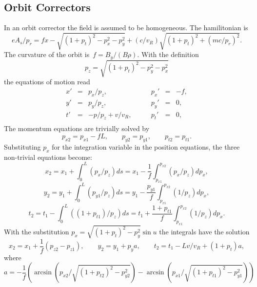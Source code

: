 \documentclass{report}
\begin{document}
\clearpage
\subsection{Orbit Correctors}
In an orbit corrector the field is assumed to be homogeneous.
The hamilitonian is
\begin{equation}
  eA_s/p_r = fx - \sqrt{(1+p_t)^2-p_x^2-p_y^2} +
  (c/v_R) \sqrt{(1+p_t)^2+(mc/p_r)^2}.
\end{equation}
The curvature of the orbit is~$f = B_y / (B \rho)$.
With the definition 
\begin{equation}
  p_z = \sqrt{(1+p_t)^2-p_y^2-p_x^2}
\end{equation}
the equations of motion read
\begin{equation}
  \begin{array}{lcllcl}
    x'&=&p_x / p_z, \qquad & p_x'&=&-f, \\
    y'&=&p_y / p_z, \qquad & p_y'&=&0, \\
    t'&=&- p / p_z+v/v_R, \qquad & p_t'&=&0, \\
  \end{array}
\end{equation}
The momentum equations are trivially solved by
\begin{equation}
  p_{x2} = p_{x1}-fL, \qquad p_{y2} = p_{y1}, \qquad p_{t2} = p_{t1}.
\end{equation}
Substituting $p_x$ for the integration variable in the position
equations, the three non-trivial equations become:
\begin{equation}
  x_2 = x_1+\int_0^L (p_x / p_z) ds =
  x_1-\frac{1}{f} \int_{p_{x1}}^{p_{x2}} (p_x / p_z) dp_x,
\end{equation}
\begin{equation}
  y_2 = y_1+\int_0^L (p_{y1} / p_z) ds =
  y_1-\frac{p_{y1}}{f} \int_{p_{x1}}^{p_{x2}} (1 / p_z) dp_x,
\end{equation}
\begin{equation}
  t_2 = t_1-\int_0^L ((1+p_{t1}) / p_z) ds =
  t_1+\frac{1+p_{t1}}{f} \int_{p_{x1}}^{p_{x2}} (1 / p_z) dp_x.
\end{equation}
With the substitution $p_x = \sqrt{(1+p_t)^2-p_y^2} \sin u$ the
integrals have the solution
\begin{equation}
  x_2 = x_1+\frac{1}{f} (p_{z2}-p_{z1}), \qquad
  y_2 = y_1+p_y a, \qquad
  t_2 = t_1-Lv/v_R+(1+p_t) a,
\end{equation}
where
\begin{equation}
  a =-\frac{1}{f} \left(
    \arcsin\left(p_{x2}/\sqrt{(1+p_{t2})^2-p_{y2}^2}\right) -
    \arcsin\left(p_{x1}/\sqrt{(1+p_{t1})^2-p_{y1}^2}\right)
  \right)
\end{equation}
\end{document}
